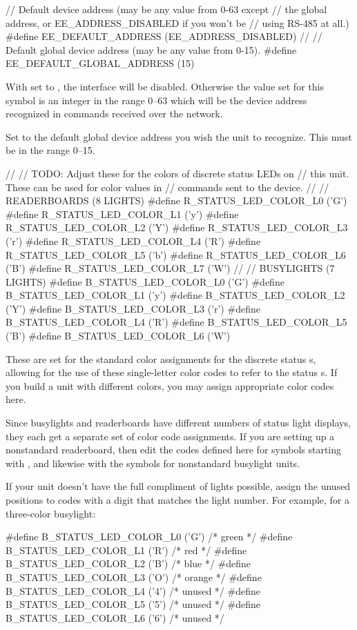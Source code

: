\begin{SourceCode}
// Default device address (may be any value from 0-63 except
// the global address, or EE_ADDRESS_DISABLED if you won't be 
// using RS-485 at all.)
#define EE_DEFAULT_ADDRESS (EE_ADDRESS_DISABLED)
//
// Default global device address (may be any value from 0-15).
#define EE_DEFAULT_GLOBAL_ADDRESS (15)
\end{SourceCode}
With  set to ,
the  interface will be disabled. Otherwise the value
set for this symbol is an integer in the range 0--63 which will be
the device address recognized in commands received over the
 network.

Set  to the default global device address you
wish the unit to recognize. This must be in the range 0--15.

\begin{SourceCode}
//
// TODO: Adjust these for the colors of discrete status LEDs on
//       this unit. These can be used for color values in
//       commands sent to the device.
//
//       READERBOARDS (8 LIGHTS)
#define R_STATUS_LED_COLOR_L0 ('G')
#define R_STATUS_LED_COLOR_L1 ('y')
#define R_STATUS_LED_COLOR_L2 ('Y')
#define R_STATUS_LED_COLOR_L3 ('r')
#define R_STATUS_LED_COLOR_L4 ('R')
#define R_STATUS_LED_COLOR_L5 ('b')
#define R_STATUS_LED_COLOR_L6 ('B')
#define R_STATUS_LED_COLOR_L7 ('W')
//
//       BUSYLIGHTS (7 LIGHTS)
#define B_STATUS_LED_COLOR_L0 ('G')
#define B_STATUS_LED_COLOR_L1 ('y')
#define B_STATUS_LED_COLOR_L2 ('Y')
#define B_STATUS_LED_COLOR_L3 ('r')
#define B_STATUS_LED_COLOR_L4 ('R')
#define B_STATUS_LED_COLOR_L5 ('B')
#define B_STATUS_LED_COLOR_L6 ('W')
\end{SourceCode}
These are set for the standard color assignments for the discrete status \led s, allowing for
the use of these single-letter color codes to refer to the status \led s. If you build a
unit with different colors, you may assign appropriate color codes here.

Since busylights and readerboards have different numbers of status light displays, they each
get a separate set of color code assignments. If you are setting up a nonstandard readerboard,
then edit the codes defined here for symbols starting with , and likewise with the
 symbols for nonstandard busylight units.

If your unit doesn't have the full compliment of lights possible, assign the unused positions
to codes with a digit that matches the light number. For example, for a three-color busylight:
\begin{SourceCode}
#define B_STATUS_LED_COLOR_L0 ('G') /* green */
#define B_STATUS_LED_COLOR_L1 ('R') /* red */
#define B_STATUS_LED_COLOR_L2 ('B') /* blue */
#define B_STATUS_LED_COLOR_L3 ('O') /* orange */
#define B_STATUS_LED_COLOR_L4 ('4') /* unused */
#define B_STATUS_LED_COLOR_L5 ('5') /* unused */
#define B_STATUS_LED_COLOR_L6 ('6') /* unused */
\end{SourceCode}

